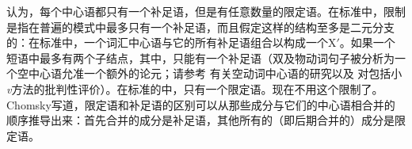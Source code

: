 \mbox{}\citet[]{Chomsky2008a}认为，每个中心语都只有一个补足语，但是有任意数量的限定语。在标准\xbartc 中，限制是指在普遍的\xbar 模式中最多只有一个补足语，而且假定这样的结构至多是二元分支的：在标准\xbartc 中，一个词汇中心语与它的所有补足语组合以构成一个X$'$。如果一个短语中最多有两个子结点，其中，只能有一个补足语（双及物动词句子被分析为一个空中心语允准一个额外的论元；请参考 有关空动词中心语的研究以及 对包括小\emph{v}方法的批判性评价）。在标准的\xbartc 中，只有一个限定语。现在不用这个限制了。Chomsky写道，限定语和补足语的区别可以从那些成分与它们的中心语相合并的顺序推导出来：首先合并的成分是补足语，其他所有的（即后期合并的）成分是限定语。

